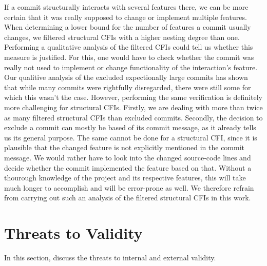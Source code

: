 If a commit structurally interacts with several features there, we can be more certain that it was really supposed to change or implement multiple features. \\
When determining a lower bound for the number of features a commit usually changes, we filtered structural CFIs with a higher nesting degree than one.
Performing a qualitative analysis of the filtered CFIs could tell us whether this measure is justified.
For this, one would have to check whether the commit was really not used to implement or change functionality of the interaction's feature.
Our qualitive analysis of the excluded expectionally large commits has shown that while many commits were rightfully disregarded, there were still some for which this wasn't the case.
However, performing the same verification is definitely more challenging for structural CFIs.
Firstly, we are dealing with more than twice as many filtered structural CFIs than excluded commits.
Secondly, the decision to exclude a commit can mostly be based of its commit message, as it already tells us its general purpose.
The same cannot be done for a structural CFI, since it is plausible that the changed feature is not explicitly mentioned in the commit message.
We would rather have to look into the changed source-code lines and decide whether the commit implemented the feature based on that.
Without a thourough knowledge of the project and its respective features, this will take much longer to accomplish and will be error-prone as well.
We therefore refrain from carrying out such an analysis of the filtered structural CFIs in this work. \\

\iffalse In the previous section, we mentioned that the number of instructions per interacting commit of a feature varies between projects.
Since instructions stem from source-code lines, their respective amount can in turn indicate the number of lines they stem from.
Thus, we can derive that the lines of code a commit usually changes or contributes to a feature likely differs between projects as well.
Disregarding \textsc{bzip2}, the number of instructions per commit range from 13 to 48.
Given that a single source-code line generally produces several llvm-IR instructions, we can predict the number of lines per commit to be below 10.
This is a surprsingly low amount indicating that a commit often only introduces small changes to a feature.
Of course, this is just a rough, and perhaps inaccurate, prediction, but it shows that our generated data can be used for many applications. \fi

\section{Threats to Validity}\label{sec:threats}

In this section, discuss the threats to internal and external validity.


